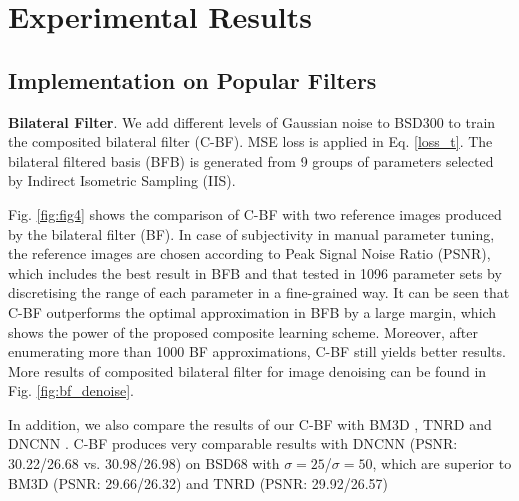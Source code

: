 \documentclass[twocolumn]{svjour3}          %
\begin{document}
\begin{figure}[!th]
\end{figure}



\section{Experimental Results} \label{sec4}

\subsection{Implementation on Popular Filters}

\textbf{Bilateral Filter}. We add different levels of Gaussian noise to BSD300 to train the composited bilateral filter (C-BF). MSE loss is applied in Eq. \ref{loss_t}. The bilateral filtered basis (BFB) is generated from 9 groups of parameters selected by Indirect Isometric Sampling (IIS).

Fig. \ref{fig:fig4} shows the comparison of C-BF with two reference images produced by the bilateral filter (BF). In case of subjectivity in manual parameter tuning, the reference images are chosen according to Peak Signal Noise Ratio (PSNR), which includes the best result in BFB and that tested in 1096 parameter sets by discretising the range of each parameter in a fine-grained way. It can be seen that C-BF outperforms the optimal approximation in BFB by a large margin, which shows the power of the proposed composite learning scheme. Moreover, after enumerating more than 1000 BF approximations, C-BF still yields better results. More results of composited bilateral filter for image denoising can be found in Fig. \ref{fig:bf_denoise}.

In addition, we also compare the results of our C-BF with BM3D \cite{bm3d}, TNRD \cite{tnrd} and DNCNN \cite{dncnn}. C-BF produces very comparable results with DNCNN \cite{dncnn} (PSNR: 30.22/26.68 vs. 30.98/26.98) on BSD68 with $\sigma=25$/$\sigma=50$, which are superior to BM3D \cite{bm3d} (PSNR: 29.66/26.32) and TNRD \cite{tnrd} (PSNR: 29.92/26.57)
\end{document}
